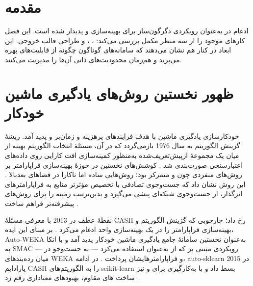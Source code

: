 \section{مقدمه}
ادغام  در  به‌عنوان رویکردی دگرگون‌ساز برای بهینه‌سازی  و  پدیدار شده است. این فصل کارهای موجود را از سه منظر مکمل بررسی می‌کند: ، ، و طراحی قالب خروجی. این ابعاد در کنار هم نشان می‌دهند که سامانه‌های گوناگون چگونه از قابلیت‌های  بهره می‌برند و هم‌زمان محدودیت‌های ذاتی آن‌ها را مدیریت می‌کنند.

\section{ظهور نخستین روش‌های یادگیری ماشین خودکار}
خودکارسازی یادگیری ماشین با هدف  فرایندهای پرهزینه و زمان‌بر  و  پدید آمد. ریشهٔ گزینش الگوریتم به سال 1976 بازمی‌گردد که در آن، مسئلهٔ انتخاب الگوریتم بهینه از میان یک مجموعهٔ ازپیش‌تعریف‌شده به‌منظور کمینه‌سازی افت کارایی روی داده‌های اعتبارسنجی صورت‌بندی شد \cite{RICE197665}. کوشش‌های نخستین در حوزهٔ بهینه‌سازی فراپارامتر بر روش‌های منفردی چون  و  متمرکز بود؛ روش‌هایی ساده اما ناکارا در فضاهای بعدبالا \cite{JMLR:v13:bergstra12a}. این روش نشان داد که جست‌وجوی تصادفی با تخصیص مؤثرتر منابع به فراپارامترهای اثرگذار، از جست‌وجوی شبکه‌ای پیشی می‌گیرد و بدین‌ترتیب زمینه را برای روش‌های پیشرفته‌تر فراهم ساخت \cite{JMLR:v13:bergstra12a}.

نقطهٔ عطف در 2013 با معرفی مسئلهٔ CASH رخ داد؛ چارچوبی که گزینش الگوریتم و بهینه‌سازی فراپارامتر را در یک بهینه‌سازی واحد ادغام می‌کرد \cite{10.1145/2487575.2487629}. بر مبنای این ایده، Auto-WEKA به‌عنوان نخستین سامانهٔ جامع یادگیری ماشین خودکار پدید آمد و با اتکا به SMAC — رویکردی مبتنی بر  که از  به‌عنوان  استفاده می‌کرد — به جست‌وجو در میان رده‌بندهای WEKA و فراپارامترهایشان پرداخت \cite{10.1145/2487575.2487629, 10.1007/978-3-642-25566-3_40}. در ادامه، auto-sklearn در 2015 پارادایم CASH را به الگوریتم‌های scikit-learn بسط داد و با به‌کارگیری  برای  و نیز ساخت ‌های مقاوم، بهبودهای معناداری رقم زد \cite{NIPS2015_11d0e628}.

